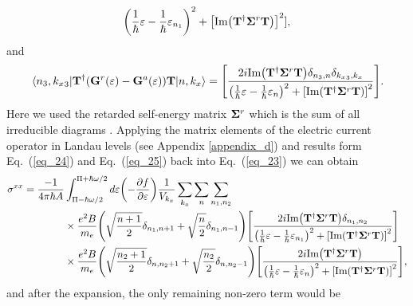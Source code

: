 \begin{widetext}
\begin{equation}
{  \qty(
  \frac{1}{\hbar}\varepsilon -
  \frac{1}{\hbar}\varepsilon_{n_1}
  )^2
  + \qty[\text{Im}\qty(\vb{T}^{\dagger} \vb{\Sigma}^r \vb{T})]^2
  }],
\end{equation}
and
\begin{equation} \label{eq_25}
  \mel{{n_3,{k_x}_3}}{
  \vb{T}^{\dagger}
  \qty(
  \vb{G}^{r} (\varepsilon) - \vb{G}^{a} (\varepsilon)
  )\vb{T}}
  {n,{k_x}} =
  \qty[
  \frac{2i \text{Im}\qty(\vb{T}^{\dagger} \vb{\Sigma}^r \vb{T})
  \delta_{n_3,n}\delta_{{k_x}_3,{k_x}}}
  {
  \qty(
  \frac{1}{\hbar}\varepsilon -
  \frac{1}{\hbar}\varepsilon_{n}
  )^2
  + \qty[\text{Im}\qty(\vb{T}^{\dagger} \vb{\Sigma}^r \vb{T})]^2
  }].
\end{equation}
Here we used the retarded self-energy matrix $\vb{\Sigma}^r$ which is the sum of all irreducible diagrams \cite{wackerl20,wackerlthesis20}. Applying the matrix elements of the electric current operator in Landau levels (see Appendix \ref{appendix_d}) and
results form Eq.~(\ref{eq_24}) and Eq.~(\ref{eq_25}) back into Eq.~(\ref{eq_23}) we can obtain
\begin{equation} \label{eq_26}
  \begin{aligned}
    {\sigma}^{xx}  =
    \frac{-1}{4\pi\hbar A} &
    \int_{\Pi-\hbar\omega/2}^{\Pi+ \hbar\omega/2} d\varepsilon
    \qty(
    -\frac{\partial f}{\partial \varepsilon})
    \frac{1}{V_{k_x}} \sum_{k_x} \sum_{n}
    \sum_{n_1,n_2}
    \\
    & \times
    \frac{e^2B}{{m_e}}
    \qty(\sqrt{\frac{n+1}{2}} \delta_{n_1,n+1} + \sqrt{\frac{n}{2}}
    \delta_{n_1,n-1})
    \qty[
    \frac{2i \text{Im}\qty(\vb{T}^{\dagger} \vb{\Sigma}^r \vb{T})
    \delta_{n_1,n_2}}
    {
    \qty(
    \frac{1}{\hbar}\varepsilon -
    \frac{1}{\hbar}\varepsilon_{n_1}
    )^2
    + \qty[\text{Im}\qty(\vb{T}^{\dagger} \vb{\Sigma}^r \vb{T})]^2
    }] \\
    & \times
    \frac{e^2B}{{m_e}}
    \qty(\sqrt{\frac{n_2+1}{2}} \delta_{n,n_2+1} + \sqrt{\frac{n_2}{2}}
    \delta_{n,n_2-1})
    \qty[
    \frac{2i \text{Im}\qty(\vb{T}^{\dagger} \vb{\Sigma}^r \vb{T})
    }
    {
    \qty(
    \frac{1}{\hbar}\varepsilon -
    \frac{1}{\hbar}\varepsilon_{n}
    )^2
    + \qty[\text{Im}\qty(\vb{T}^{\dagger} \vb{\Sigma}^r \vb{T})]^2
    }],
  \end{aligned}
\end{equation}
and after the expansion, the only remaining non-zero term would be
\begin{equation} \label{eq_27}
  \begin{aligned}

\end{aligned}
\end{equation}
\end{widetext}
